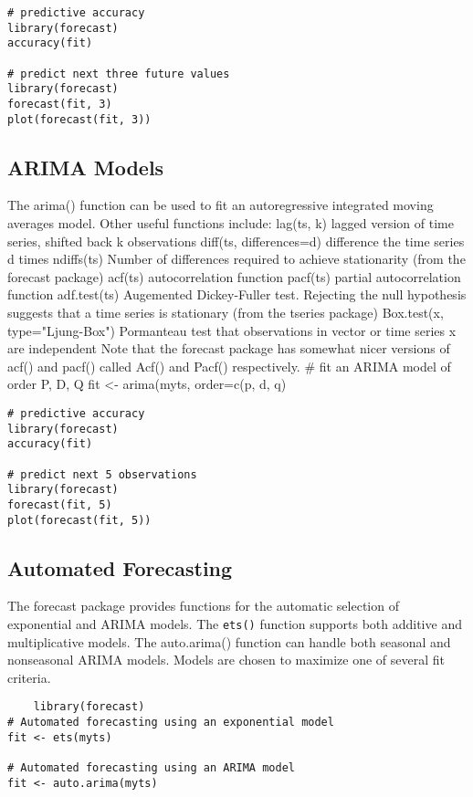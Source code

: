 \begin{framed}
	\begin{verbatim}
# predictive accuracy
library(forecast)
accuracy(fit)

# predict next three future values
library(forecast)
forecast(fit, 3)
plot(forecast(fit, 3))
\end{verbatim}
\end{framed}
\subsection*{ARIMA Models}
The arima() function can be used to fit an autoregressive integrated moving averages model. Other useful functions include:
lag(ts, k)	lagged version of time series, shifted back k observations
diff(ts, differences=d)	difference the time series d times
ndiffs(ts)	Number of differences required to achieve stationarity (from the forecast package)
acf(ts)	autocorrelation function
pacf(ts)	partial autocorrelation function
adf.test(ts)	Augemented Dickey-Fuller test. Rejecting the null hypothesis suggests that a time series is stationary (from the tseries package)
Box.test(x, type="Ljung-Box")	Pormanteau test that observations in vector or time series x are independent
Note that the forecast package has somewhat nicer versions of acf() and pacf() called Acf() and Pacf() respectively.
# fit an ARIMA model of order P, D, Q
fit <- arima(myts, order=c(p, d, q)

\begin{framed}
\begin{verbatim}
# predictive accuracy
library(forecast)
accuracy(fit)

# predict next 5 observations
library(forecast)
forecast(fit, 5)
plot(forecast(fit, 5))
\end{verbatim}
\end{framed}
\subsection*{Automated Forecasting}
The forecast package provides functions for the automatic selection of exponential and ARIMA models. The \texttt{ets()} function supports both additive and multiplicative models. The auto.arima() function can handle both seasonal and nonseasonal ARIMA models. Models are chosen to maximize one of several fit criteria.
\begin{framed}
	\begin{verbatim}
	library(forecast)
# Automated forecasting using an exponential model
fit <- ets(myts)

# Automated forecasting using an ARIMA model
fit <- auto.arima(myts)
\end{verbatim}
\end{framed}

